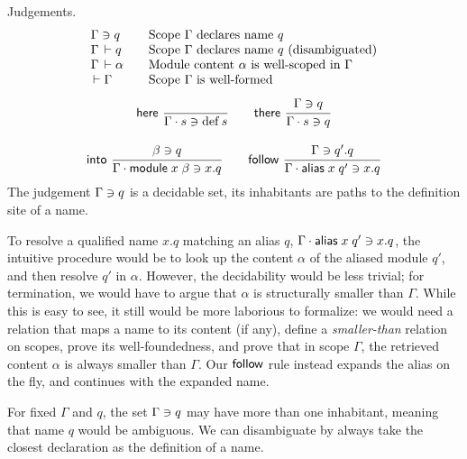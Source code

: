 \documentclass{article}
\theoremstyle{definition}
\theoremstyle{plain}
\theoremstyle{remark}
\begin{document}
Judgements.
\[
\begin{array}{l@{\qquad}l}
  \Contains \Gamma q & \mbox{Scope $\Gamma$ declares name $q$} \\
  \Declares \Gamma q & \mbox{Scope $\Gamma$ declares name $q$ (disambiguated)} \\
  \WContent \Gamma \alpha & \mbox{Module content $\alpha$ is well-scoped in $\Gamma$}\\
  \WScope \Gamma & \mbox{Scope $\Gamma$ is well-formed}
\end{array}
\]
\begin{gather*}
  \nru{\rhere
     }{
     }{\Contains {\Gamma \chop s} {\defined s}}
\qquad
   \nru{\rthere
      }{\Contains \Gamma q
      }{\Contains {\Gamma \chop s} q}
\\[2ex]
  \nru{\rinto
     }{\Contains \beta q
     }{\Contains {\Gamma \chop \mdef x \beta} {x.q}}
\qquad
  \nru{\rfollow
     }{\Contains \Gamma {q'.q}
     }{\Contains {\Gamma \chop \malias x q'} {x.q}}
\end{gather*}
The judgement $\Gamma\ni q$ is a decidable set, its inhabitants
are paths to the definition site of a name.

To resolve a qualified name $x.q$ matching an alias $q$,
$\Gamma \cdot \mathsf{alias}\;x\;q'\ni x.q$,
the intuitive procedure would be to look up the content $\alpha$
of the aliased module $q'$, and then resolve $q'$ in $\alpha$.
However, the decidability would be less trivial; for termination,
we would have to argue that $\alpha$ is structurally smaller
than $\Gamma$.  While this is easy to see, it still would be more
laborious to formalize: we would need a relation that maps a name to
its content (if any), define a \emph{smaller-than} relation on scopes,
prove its well-foundedness, and prove that in scope $\Gamma$,
the retrieved content $\alpha$ is always smaller than $\Gamma$.
Our $\mathsf{follow}$ rule instead expands the alias on the fly, and
continues with the expanded name.


For fixed $\Gamma$ and $q$, the set $\Gamma\ni q$
may have more than one inhabitant, meaning that
name $q$ would be ambiguous.
We can disambiguate by always take the closest declaration as the
definition of a name.
\end{document}
